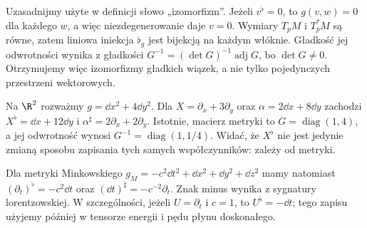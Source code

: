 Uzasadnijmy użyte w definicji słowo „izomorfizm”.
Jeżeli $v^\flat=0$, to $g(v,w)=0$ dla każdego $w$,
a więc niezdegenerowanie daje $v=0$.
Wymiary $T_pM$ i $T_p^*M$ są równe, zatem liniowa
iniekcja $\flat_g$ jest bijekcją na każdym włóknie.
Gładkość jej odwrotności wynika z gładkości
$G^{-1}=(\det G)^{-1}\operatorname{adj}G$, bo $\det G\ne0$.
Otrzymujemy więc izomorfizmy gładkich wiązek,
a nie tylko pojedynczych przestrzeni wektorowych.

\begin{przyklad}
\label{prz:izomorfizmy-muzyczne}
Na $\R^2$ rozważmy $g=\dd x^2+4\dd y^2$.
Dla $X=\partial_x+3\partial_y$ oraz
$\alpha=2\dd x+8\dd y$ zachodzi
$X^\flat=\dd x+12\dd y$ i
$\alpha^\sharp=2\partial_x+2\partial_y$.
Istotnie, macierz metryki to $G=\operatorname{diag}(1,4)$,
a jej odwrotność wynosi $G^{-1}=\operatorname{diag}(1,1/4)$.
Widać, że $X^\flat$ nie jest jedynie zmianą sposobu
zapisania tych samych współczynników: zależy od metryki.

Dla metryki Minkowskiego
$g_M=-c^2\dd t^2+\dd x^2+\dd y^2+\dd z^2$ mamy natomiast
$(\partial_t)^\flat=-c^2\dd t$ oraz
$(\dd t)^\sharp=-c^{-2}\partial_t$.
Znak minus wynika z sygnatury lorentzowskiej.
W szczególności, jeżeli $U=\partial_t$ i $c=1$,
to $U^\flat=-\dd t$; tego zapisu użyjemy
później w tensorze energii i pędu płynu doskonałego.
\end{przyklad}

